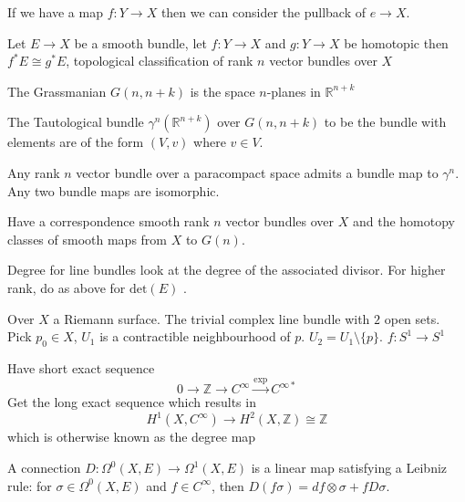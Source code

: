 If we have a map $ f: Y \rightarrow X $ then we can consider the pullback of $ e \rightarrow X $. 


\begin{proposition}
    Let $E \rightarrow X $ be a smooth bundle, let $ f: Y \rightarrow  X $ 
    and $ g: Y \rightarrow X $ be homotopic then $ f^* E \cong g^* E $, 
    topological classification of rank $n$ vector bundles over $ X $ 
\end{proposition}

\begin{definition}
    The Grassmanian $G(n, n+k) $ is the space $n$-planes in $ \mathbb{R} ^{n+k} $
\end{definition}

\begin{definition}
     The Tautological bundle $ \gamma^n ( \mathbb{R} ^{n+k} ) $ over $ G(n, n+k) $
     to be the bundle with elements are of the form $ (V, v) $ where $ v \in V$. 
\end{definition}

\begin{theorem}
    Any rank $n$ vector bundle over a paracompact space admits a bundle map to $ \gamma^n $. 
    Any two bundle maps are isomorphic. 
\end{theorem}

Have a correspondence smooth rank $n$ vector bundles over $ X $ 
and the homotopy classes of smooth maps from $ X $ to $ G(n) $. 

Degree for line bundles look at the degree of the associated divisor. 
For higher rank, do as above for $ \mathrm{det} ( E) $ . 


Over $ X$ a Riemann surface. 
The trivial complex line bundle with $ 2$ open sets. 
Pick  $p_0 \in X $, $U_1 $ is a contractible neighbourhood of $p$.
$ U_2  = U_1 \setminus \{p\} $. 
$f : S^1 \rightarrow S^1 $ 

Have short exact sequence 
\begin{equation}
    0 \rightarrow  \mathbb{Z}  \rightarrow  C^\infty \xrightarrow{\mathrm{exp}} C^{\infty *}
\end{equation}
Get the long exact sequence which results in 
\begin{equation}
    H^1 ( X, C^\infty ) \rightarrow H^2( X, \mathbb{Z} ) \cong \mathbb{Z} 
\end{equation}
which is otherwise known as the degree map

\begin{definition}
 A connection $ D: \Omega^0 ( X, E) \rightarrow  \Omega ^1 ( X, E) $ is a linear map satisfying a Leibniz rule:
    for $ \sigma \in \Omega^0 ( X, E) $ and $f \in C^\infty $, then 
    $ D(f \sigma) = df \otimes \sigma + f D\sigma$. 
\end{definition}

